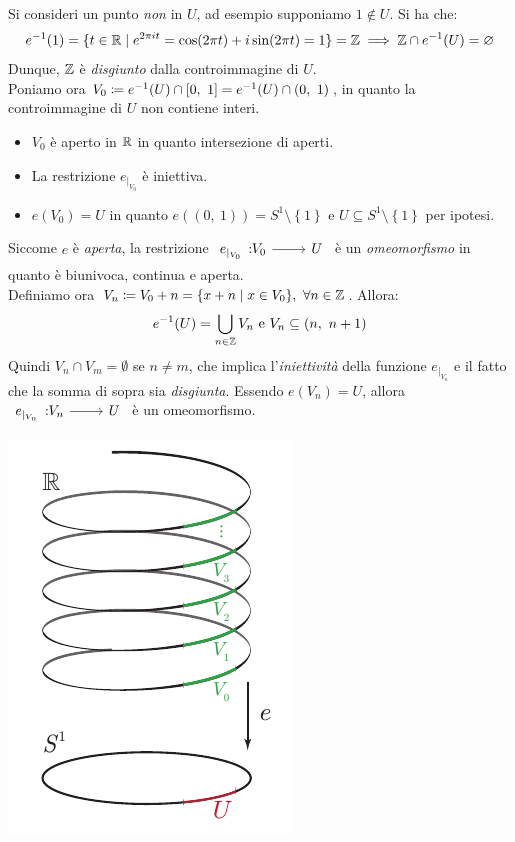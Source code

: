 \begin{demonstration}
	Si consideri un punto \textit{non} in $U$, ad esempio supponiamo $1\notin U$. Si ha che:
	\begin{equation*}
		e^{-1}(1)=\{t\in\mathbb{R} \mid e^{2\pi i t}=\cos(2\pi t)+i\sin(2\pi t)=1\}=\mathbb{Z} \implies \mathbb{Z} \cap e^{-1}(U)=\varnothing
	\end{equation*}
	Dunque, $\mathbb{Z}$ è \textit{disgiunto} dalla controimmagine di $U$.\\
	Poniamo ora $V_0\coloneqq e^{-1}(U)\cap \left[0,\ 1\right]= e^{-1}(U)\cap (0,\ 1)$, in quanto la controimmagine di $U$ non contiene interi.\\
		\begin{minipage}[t]{0.68\textwidth}
	\begin{itemize}
	\item $V_0$ è aperto in $\mathbb{R}$ in quanto intersezione di aperti.
	\item La restrizione $e_{\mid_{V_0}}$ è iniettiva.
	\item $e(V_0)=U$ in quanto $e\left( (0,\ 1) \right)=S^1\setminus\left\{1\right\}$ e $U\subseteq S^1\setminus\left\{1\right\}$ per ipotesi.
\end{itemize}
Siccome $e$ è \textit{aperta}, la restrizione $\funz {e_{\mid_{V_0}}} {V_0} U$ è un \textit{omeomorfismo} in quanto è biunivoca, continua e aperta.\\
Definiamo ora $V_n\coloneqq V_0 +n=\{ x+n \mid x\in V_0\},\ \forall n\in\mathbb{Z}$. Allora:
\begin{equation*}
	e^{-1}(U)=\mathop{{\bigcup}}\displaylimits_{n\in\mathbb{Z}} V_n\text{ e }V_n\subseteq (n,\ n+1)
\end{equation*} 
Quindi $V_n\cap V_m=\emptyset$ se $n\neq m$, che implica l'\textit{iniettività} della funzione $e_{\mid_{V_n}}$ e il fatto che la somma di sopra sia \textit{disgiunta}. Essendo $e(V_n)=U$, allora $\funz  {e_{\mid_{V_n}}} {V_n} U$ è un omeomorfismo.
	\end{minipage}
	\begin{minipage}[t]{0.31\textwidth}\vspace{-10pt}
	\includegraphics[trim=0cm 0cm 0cm 0cm,clip,scale=1]{images/spiralexponential.pdf}
	\end{minipage}
\end{demonstration}


